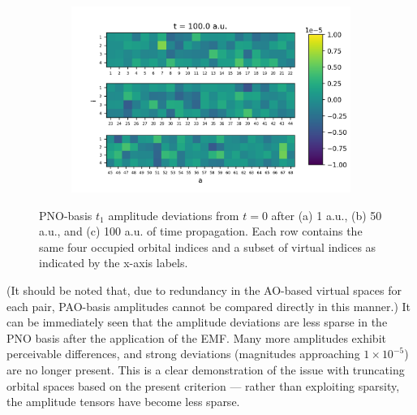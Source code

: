 \begin{figure}
\begin{subfigure}{.5\textwidth}
        \includegraphics[scale=0.5]{p3/figures/PNO_delta_t1_100.png}
        \caption{}
        \label{fig:PNO_t1_100}
    \end{subfigure}
    \caption{PNO-basis $t_1$ amplitude deviations from $t = 0$ after (a) 1 a.u., (b) 50 a.u., and 
    (c) 100 a.u. of time propagation. Each row contains the same four occupied orbital indices
    and a subset of virtual indices as indicated by the x-axis labels.}
    \label{fig:pno_amps}
\end{figure}
(It should be noted that, due to redundancy in the AO-based virtual 
spaces for each pair, PAO-basis amplitudes cannot be compared directly in 
this manner.)
It can be immediately seen that the amplitude deviations
are less sparse in the PNO basis after the application of the EMF. 
Many more amplitudes exhibit
perceivable differences, and strong deviations (magnitudes approaching 
$1\times 10^{-5}$) are no longer present. This is a clear demonstration
of the issue with truncating orbital spaces based on the present criterion ---
rather than exploiting sparsity, the amplitude tensors have become less sparse.

